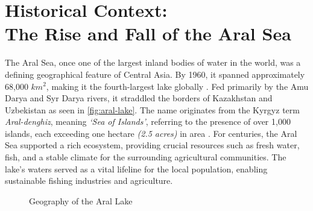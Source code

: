 \chapter[Historical Context: The Rise and Fall of the Aral Sea]{Historical Context:\\The Rise and Fall of the Aral Sea}
\label{cp:history}

The Aral Sea, once one of the largest inland bodies of water in the world, was a defining geographical feature of Central Asia. By 1960, it spanned approximately 68,000 $km^{2}$, making it the fourth-largest lake globally \cite{britannica_aral}. Fed primarily by the Amu Darya and Syr Darya rivers, it straddled the borders of Kazakhstan and Uzbekistan as seen in \autoref{fig:aral-lake}. The name originates from the Kyrgyz term \textit{Aral-denghiz}, meaning \textit{`Sea of Islands'}, referring to the presence of over 1,000 islands, each exceeding one hectare \textit{(2.5 acres)} in area \autocite{britannica_aral}. For centuries, the Aral Sea supported a rich ecosystem, providing crucial resources such as fresh water, fish, and a stable climate for the surrounding agricultural communities. The lake’s waters served as a vital lifeline for the local population, enabling sustainable fishing industries and agriculture.

\begin{figure}[htpb]
    \centering
    \caption{Geography of the Aral Lake}
    \label{fig:aral-lake}
\end{figure}

